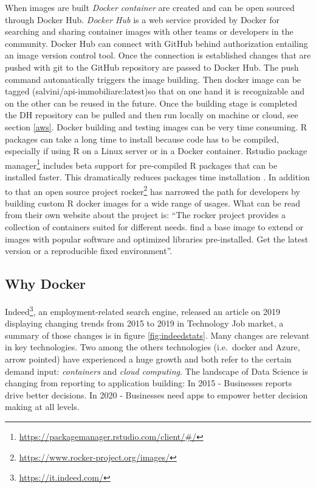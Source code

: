 \documentclass[
  12pt,
  a4paper,
  oneside]{book}
\DeclareRobustCommand{\href}[2]{#2\footnote{\url{#1}}}
\theoremstyle{definition}
\theoremstyle{definition}
\theoremstyle{definition}
\theoremstyle{remark}
\begin{document}
When images are built \emph{Docker container} are created and can be open sourced through Docker Hub.
\emph{Docker Hub} is a web service provided by Docker for searching and sharing container images with other teams or developers in the community. Docker Hub can connect with GitHub behind authorization entailing an image version control tool. Once the connection is established changes that are pushed with git to the GitHub repository are passed to Docker Hub. The push command automatically triggers the image building. Then docker image can be tagged (salvini/api-immobiliare:latest)so that on one hand it is recognizable and on the other can be reused in the future. Once the building stage is completed the DH repository can be pulled and then run locally on machine or cloud, see section \ref{aws}.
Docker building and testing images can be very time consuming. R packages can take a long time to install because code has to be compiled, especially if using R on a Linux server or in a Docker container.
Rstudio \href{https://packagemanager.rstudio.com/client/\#/}{package manager} includes beta support for pre-compiled R packages that can be installed faster. This dramatically reduces packages time installation \citep{nolis_2020}.
In addition to that an open source project \href{https://www.rocker-project.org/images/}{rocker} has narrowed the path for developers by building custom R docker images for a wide range of usages. What can be read from their own website about the project is: ``The rocker project provides a collection of containers suited for different needs. find a base image to extend or images with popular software and optimized libraries pre-installed. Get the latest version or a reproducible fixed environment''.

\hypertarget{why-docker}{%
\subsection{Why Docker}\label{why-docker}}

\href{https://it.indeed.com/}{Indeed}, an employment-related search engine, released an article on 2019 displaying changing trends from 2015 to 2019 in Technology Job market, a summary of those changes is in figure \ref{fig:indeedstats}. Many changes are relevant in key technologies. Two among the others technologies (i.e.~docker and Azure, arrow pointed) have experienced a huge growth and both refer to the certain demand input: \emph{containers} and \emph{cloud computing}.
The landscape of Data Science is changing from reporting to application building:
In 2015 - Businesses reports drive better decisions.
In 2020 - Businesses need apps to empower better decision making at all levels.
\end{document}
